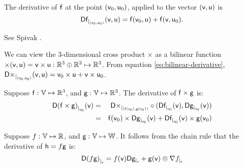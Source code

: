 The derivative of $\mathsf{f}$
at the point $(\mathsf{v}_0,\mathsf{u}_0)$, applied to the vector $(\mathsf{v},\mathsf{u})$ is
\begin{equation}
\label{eq:bilinear-derivative}
\Dc{\f}{(\v_0,\u_0)}{\v,\u} = \f(\v_0,\u) + \f(\v,\u_0).
\end{equation}

See Spivak \cite[ex.~2-12]{spivak-1965}.

\label{sec:Derivatives-of-cross-products}

We can view the 3-dimensional cross product
$ \times $
as a bilinear function
$\times(\mathsf{v},\mathsf{u}) = \mathsf{v} \times \mathsf{u} : \mathbb{R}^3 \oplus \mathbb{R}^3 \mapsto \mathbb{R}^3$.
From equation \ref{eq:bilinear-derivative},
${\mathsf{D}{\times}_{\mid_{(\mathsf{v}_0,\mathsf{u}_0)}}({\mathsf{v},\mathsf{u}})} = \mathsf{v}_0 \times \mathsf{u} + \mathsf{v} \times \mathsf{u}_0$.

Suppose
$\mathsf{f}:\mathbb{V} \mapsto \mathbb{R}^3$, and
$\mathsf{g}:\mathbb{V} \mapsto \mathbb{R}^3$.
The derivative of $\mathsf{f} \times \mathsf{g}$ is:
\begin{eqnarray}
{\mathsf{D}{(\mathsf{f}\times \mathsf{g})}_{\mid_{\mathsf{v}_0}}({\mathsf{v}})}
& =
& {\mathsf{D}{\times}_{\mid_{(\mathsf{f}(\mathsf{v}_0),\mathsf{g}(\mathsf{v}_0))}}} \circ ({\mathsf{D}{\mathsf{f}}_{\mid_{\mathsf{v}_0}}({\mathsf{v}})}, {\mathsf{D}{\mathsf{g}}_{\mid_{\mathsf{v}_0}}({\mathsf{v}})})
\\
& =
& \mathsf{f}(\mathsf{v}_0) \times {\mathsf{D}{\mathsf{g}}_{\mid_{\mathsf{v}_0}}({\mathsf{v}})} + {\mathsf{D}{\mathsf{f}}_{\mid_{\mathsf{v}_0}}({\mathsf{v}})} \times \mathsf{g}(\mathsf{v}_0) \nonumber
\end{eqnarray}

\label{sec:Derivatives-of-scalar-products}

Suppose
$f:\mathbb{V} \mapsto \mathbb{R}$, and
$\mathsf{g}:\mathbb{V} \mapsto \mathbb{W}$.
It follows from the chain rule that the derivative of $\mathsf{h} = f\mathsf{g}$ is:
\begin{equation}
\label{eq:scalar_product_derivative}
\Db{(f\g)}{\v} =  f(\v) \Db{\g}{\v} + \g(\v) \otimes \Gb{f}{\v}
\end{equation}

\label{sec:Derivatives-of-normalized-functionss}

